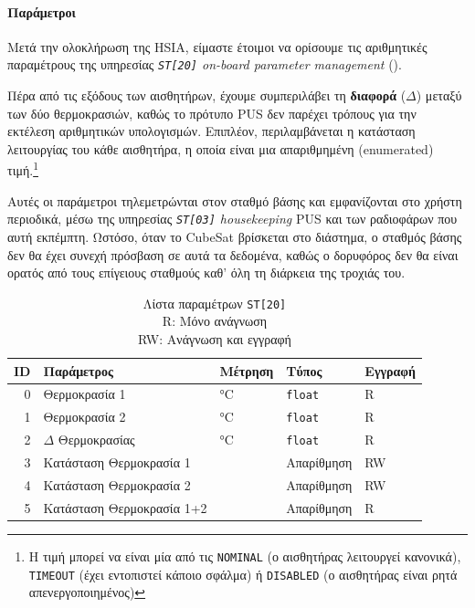 \documentclass[a4paper,nobib]{tufte-book}
\begin{document}

\paragraph{Παράμετροι}

Μετά την ολοκλήρωση της \acl{HSIA}, είμαστε έτοιμοι να ορίσουμε τις αριθμητικές παραμέτρους της υπηρεσίας \emph{\texttt{ST[20]} on-board parameter management} \autocite{ECSS-E-ST-70-41C} ().

Πέρα από τις εξόδους των αισθητήρων, έχουμε συμπεριλάβει τη \textbf{διαφορά} (\(\Delta\)) μεταξύ των δύο θερμοκρασιών, καθώς το πρότυπο \acs{PUS} δεν παρέχει τρόπους για την εκτέλεση αριθμητικών υπολογισμών. Επιπλέον, περιλαμβάνεται η κατάσταση λειτουργίας του κάθε αισθητήρα, η οποία είναι μια απαριθμημένη (enumerated) τιμή.\footnote{Η τιμή μπορεί να είναι μία από τις \texttt{NOMINAL} (ο αισθητήρας λειτουργεί κανονικά), \texttt{TIMEOUT} (έχει εντοπιστεί κάποιο σφάλμα) ή \texttt{DISABLED} (ο αισθητήρας είναι ρητά απενεργοποιημένος)} 

Αυτές οι παράμετροι τηλεμετρώνται στον σταθμό βάσης και εμφανίζονται στο χρήστη περιοδικά, μέσω της υπηρεσίας \emph{\texttt{ST[03]} housekeeping} \ac{PUS} και των ραδιοφάρων που αυτή εκπέμπτη. Ωστόσο, όταν το CubeSat βρίσκεται στο διάστημα, ο σταθμός βάσης δεν θα έχει συνεχή πρόσβαση σε αυτά τα δεδομένα, καθώς ο δορυφόρος δεν θα είναι ορατός από τους επίγειους σταθμούς καθ' όλη τη διάρκεια της τροχιάς του.

\begin{table}[h]
	\centering
	\caption[Λίστα παραμέτρων \texttt{ST[20]}]{Λίστα παραμέτρων \texttt{ST[20]}\\R: Μόνο ανάγνωση\\RW: Ανάγνωση και εγγραφή}
	\label{tab:demo_params}
	\begin{tabularx}{\textwidth}{@{}rXlll@{}}
		\toprule
		ID & Παράμετρος              & Μέτρηση & Τύπος & Εγγραφή \\ \midrule
		0            & Θερμοκρασία 1          & \si{\celsius}      & \texttt{float} & R     \\
		1            & Θερμοκρασία 2          & \si{\celsius}      & \texttt{float} & R    \\
		2            & \(\Delta\) Θερμοκρασίας & \si{\celsius}      & \texttt{float} & R    \\
		3            & Κατάσταση Θερμοκρασία 1         &       & Απαρίθμηση   & RW  \\
		4            & Κατάσταση Θερμοκρασία 2         &       & Απαρίθμηση   & RW  \\
		5			 & Κατάσταση Θερμοκρασία 1+2       &		& Απαρίθμηση   & R  \\ \bottomrule
	\end{tabularx}
\end{table}
\end{document}
